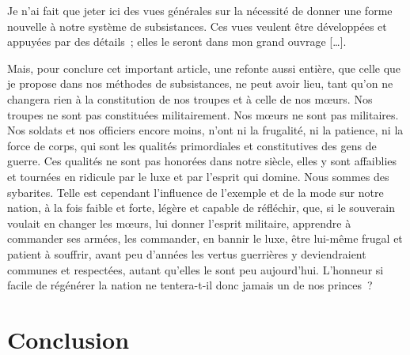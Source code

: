 \documentclass[french,twoside]{book} %
\begin{document}
Je n’ai fait que jeter ici des vues générales sur la nécessité de donner une forme nouvelle à notre système de subsistances. Ces vues veulent être développées et appuyées par des détails ; elles le seront dans mon grand ouvrage […].\par
Mais, pour conclure cet important article, une refonte aussi entière, que celle que je propose dans nos méthodes de subsistances, ne peut avoir lieu, tant qu’on ne changera rien à la constitution de nos troupes et à celle de nos mœurs. Nos troupes ne sont pas constituées militairement. Nos mœurs ne sont pas militaires. Nos soldats et nos officiers encore moins, n’ont ni la frugalité, ni la patience, ni la force de corps, qui sont les qualités primordiales et constitutives des gens de guerre. Ces qualités ne sont pas honorées dans notre siècle, elles y sont affaiblies et tournées en ridicule par le luxe et par l’esprit qui domine. Nous sommes des sybarites. Telle est cependant l’influence de l’exemple et de la mode sur notre nation, à la fois faible et forte, légère et capable de réfléchir, que, si le souverain voulait en changer les mœurs, lui donner l’esprit militaire, apprendre à commander ses armées, les commander, en bannir le luxe, être lui-même frugal et patient à souffrir, avant peu d’années les vertus guerrières y deviendraient communes et respectées, autant qu’elles le sont peu aujourd’hui. L’honneur si facile de régénérer la nation ne tentera-t-il donc jamais un de nos princes ?
\section[{Conclusion}]{Conclusion}\renewcommand{\leftmark}{Conclusion}
\end{document}
